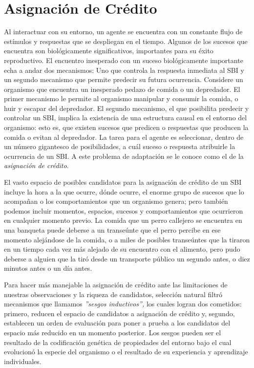\documentclass[
  letterpaper,
]{book}
\begin{document}

\chapter{Asignación de Crédito}\label{asignaciuxf3n-de-cruxe9dito}

Al interactuar con su entorno, un agente se encuentra con un constante
flujo de estímulos y respuestas que se despliegan en el tiempo. Algunos
de los sucesos que encuentra son biológicamente significativos,
importantes para su éxito reproductivo. El encuentro inesperado con un
suceso biológicamente importante echa a andar dos mecanismos: Uno que
controla la respuesta inmediata al SBI y un segundo mecanismo que
permite predecir su futura ocurrencia. Considere un organismo que
encuentra un inesperado pedazo de comida o un depredador. El primer
mecanismo le permite al organismo manipular y consumir la comida, o huir
y escapar del depredador. El segundo mecanismo, el que posibilita
predecir y controlar un SBI, implica la existencia de una estructura
causal en el entorno del organismo: esto es, que existen sucesos que
predicen o respuestas que producen la comida o evitan al depredador. La
tarea para el agente es seleccionar, dentro de un número gigantesco de
posibilidades, a cuál suceso o respuesta atribuirle la ocurrencia de un
SBI. A este problema de adaptación se le conoce como el de la
\emph{asignación de crédito}.

El vasto espacio de posibles candidatos para la asignación de crédito de
un SBI incluye la hora a la que ocurre, dónde ocurre, el enorme grupo de
sucesos que lo acompañan o los comportamientos que un organismo genera;
pero también podemos incluir momentos, espacios, sucesos y
comportamientos que ocurrieron en cualquier momento previo. La comida
que un perro callejero se encuentra en una banqueta puede deberse a un
transeúnte que el perro percibe en ese momento alejándose de la comida,
o a miles de posibles transeúntes que la tiraron en un tiempo cada vez
más alejado de su encuentro con el alimento, pero pudo deberse a alguien
que la tiró desde un transporte público un segundo antes, o diez minutos
antes o un día antes.

Para hacer más manejable la asignación de crédito ante las limitaciones
de nuestras observaciones y la riqueza de candidatos, selección natural
filtró mecanismos que llamamos \emph{''sesgos inductivos'',} los cuales
logran dos cometidos: primero, reducen el espacio de candidatos a
asignación de crédito y, segundo, establecen un orden de evaluación para
poner a prueba a los candidatos del espacio más reducido en un momento
posterior. Los sesgos pueden ser el resultado de la codificación
genética de propiedades del entorno bajo el cual evolucionó la especie
del organismo o el resultado de su experiencia y aprendizaje
individuales.
\end{document}
